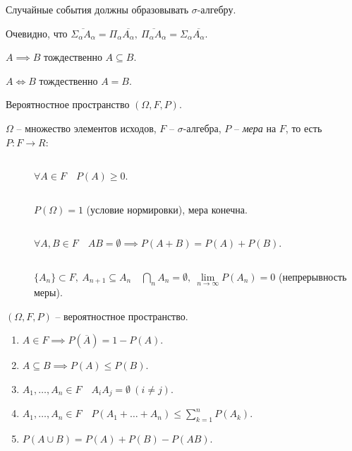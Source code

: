 \begin{remark}
    Случайные события должны образовывать $ \sigma $-алгебру.
\end{remark}

\begin{remark}
    Очевидно, что $ \overline{\Sigma_\alpha A_\alpha} = \Pi_\alpha \overline{A_\alpha}, \ \overline{\Pi_\alpha A_\alpha} = \Sigma_\alpha \overline{A_\alpha} $.
\end{remark}

\begin{remark}
    $ A \implies B $ тождественно $ A \subseteq B $.

    $ A \iff B $ тождественно $ A = B $.
\end{remark}

\begin{definition}
    Вероятностное пространство $ (\Omega, F, P) $.

    $ \Omega $ -- множество элементов исходов, $ F $ -- $ \sigma $-алгебра, $ P $ -- \emph{мера} на $ F $, то есть $ P: F \longrightarrow R $:
    \begin{description}
        \item[$ \quad $] $ \forall A \in F \quad P(A) \geqslant 0 $.
        \item[$ \quad $] $ P(\Omega) = 1 $ (условие нормировки), мера конечна.
        \item[$ \quad $] $ \forall A,B \in F \quad AB = \emptyset \implies P(A + B) = P(A) + P(B) $.
        \item[$ \quad $] $ \{A_n\}\subset F, \ A_{n+1} \subseteq A_n \quad \bigcap_n A_n = \emptyset, \ \underset{n \rightarrow \infty}{\lim}P(A_n) = 0 $ (непрерывность меры).
    \end{description}
\end{definition}

\begin{theorem}
    $ (\Omega,F,P) $ -- вероятностное пространство.
    \begin{enumerate}
        \item $ A \in F \implies P(\overline{A}) = 1 - P(A) $.
        \item $ A \subseteq B \implies P(A) \leqslant P(B) $.
        \item $ A_1,\ldots,A_n \in F \quad A_iA_j = \emptyset \ (i \ne j) $.
        \item $ A_1,\ldots,A_n \in F \quad P(A_1 + \ldots + A_n) \leqslant \sum_{k=1}^{n}P(A_k) $.
        \item $ P(A \cup B) = P(A) + P(B) - P(AB) $.
    \end{enumerate}
\end{theorem}

